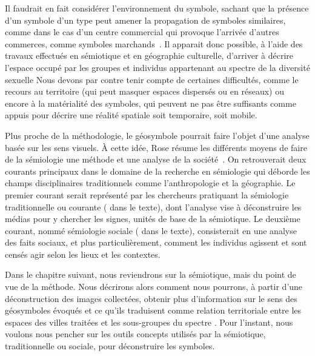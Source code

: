 Il faudrait en fait considérer l'environnement du symbole, sachant que la présence d'un symbole d'un type peut amener la propagation de symboles similaires, comme dans le cas d'un centre commercial qui provoque l'arrivée d'autres commerces, comme symboles marchands~\citep[7-8]{Monnet1998}.
Il apparait donc possible, à l'aide des travaux effectués en sémiotique et en géographie culturelle, d'arriver à décrire l'espace occupé par les groupes et individus appartenant au spectre de la diversité sexuelle
Nous devons par contre tenir compte de certaines difficultés, comme le recours au territoire (qui peut masquer espaces dispersés ou en réseaux) ou encore à la matérialité des symboles, qui peuvent ne pas être suffisants comme appuis pour décrire une réalité spatiale soit temporaire, soit mobile.

Plus proche de la méthodologie, le géosymbole pourrait faire l'objet d'une analyse basée sur les sens visuels.
À cette idée, Rose résume les différents moyens de faire de la sémiologie une méthode et une analyse de la société~\citep[69--73]{Rose2001}.
On retrouverait deux courants principaux dans le domaine de la recherche en sémiologie qui déborde les champs disciplinaires traditionnels comme l'anthropologie et la géographie.
Le premier courant serait représenté par les chercheurs pratiquant la sémiologie traditionnelle ou courante ( dans le texte), dont l'analyse vise à déconstruire les médias pour y chercher les signes, unités de base de la sémiotique.
Le deuxième courant, nommé sémiologie sociale ( dans le texte), consisterait en une analyse des faits sociaux, et plus particulièrement, comment les individus agissent et sont censés agir selon les lieux et les contextes.

Dans le chapitre suivant, nous reviendrons sur la sémiotique, mais du point de vue de la méthode.
Nous décrirons alors comment nous pourrons, à partir d'une déconstruction des images collectées, obtenir plus d'information sur le sens des géosymboles évoqués et ce qu'ils traduisent comme relation territoriale entre les espaces des villes traitées et les sous-groupes du spectre \lgbt{}.
Pour l'instant, nous voulons nous pencher sur les outils concepts utilisés par la sémiotique, traditionnelle ou sociale, pour déconstruire les symboles.

